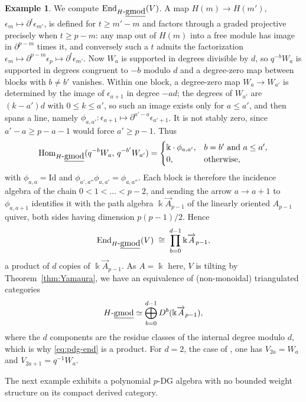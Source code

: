 \documentclass[11pt]{article}
\theoremstyle{definition}
\newtheorem{example}[thm]{Example}
\numberwithin{equation}{section}
\def\udgmod{\mbox{-\underline{gmod}}}
\def\Id{\mathrm{Id}}
\newcommand{\kk}{\Bbbk}
\newcommand{\Hom}{\operatorname{Hom}}
\newcommand{\End}{\operatorname{End}}
\begin{document}
\begin{example}
We compute $\End_{H\udgmod}(V)$.  A map
$H(m)\to H(m')$, $\epsilon_m\mapsto\partial^{t}\epsilon_{m'}$, is defined
for $t\ge m'-m$ and factors through a graded projective precisely when
$t\ge p-m$: any map out of $H(m)$ into a free module has image in
$\partial^{p-m}$ times it, and conversely such a $t$ admits the factorization
$\epsilon_m\mapsto\partial^{p-m}\epsilon_p\mapsto\partial^{t}\epsilon_{m'}$.
Now $W_a$ is supported in degrees divisible by $d$, so $q^{-b}W_a$ is
supported in degrees congruent to $-b$ modulo $d$ and a degree-zero map
between blocks with $b\ne b'$ vanishes.  Within one block, a degree-zero map
$W_a\to W_{a'}$ is determined by the image of $\epsilon_{a+1}$ in degree
$-ad$; the degrees of $W_{a'}$ are $(k-a')d$ with $0\le k\le a'$, so such an
image exists only for $a\le a'$, and then spans a line, namely
$\phi_{a,a'}\colon\epsilon_{a+1}\mapsto\partial^{a'-a}\epsilon_{a'+1}$.  It is
not stably zero, since $a'-a\ge p-a-1$ would force $a'\ge p-1$.  Thus
\[
\Hom_{H\udgmod}(q^{-b}W_a,\,q^{-b'}W_{a'})=
\begin{cases}
\kk\cdot\phi_{a,a'},& b=b'\text{ and }a\le a',\\
0,&\text{otherwise,}
\end{cases}
\]
with $\phi_{a,a}=\Id$ and $\phi_{a',a''}\phi_{a,a'}=\phi_{a,a''}$.  Each block
is therefore the incidence algebra of the chain $0<1<\dots<p-2$, and sending
the arrow $a\to a+1$ to $\phi_{a,a+1}$ identifies it with the path algebra
$\kk\overrightarrow{A}_{p-1}$ of the linearly oriented $A_{p-1}$ quiver, both sides having
dimension $p(p-1)/2$.  Hence
\begin{equation}\label{eq:pdg-end}
\End_{H\udgmod}(V)\;\cong\;\prod_{b=0}^{d-1}\kk\overrightarrow{A}_{p-1} ,
\end{equation}
a product of $d$ copies of $\kk\overrightarrow{A}_{p-1}$.  As $A=\kk$ here, $V$ is tilting by Theorem~\ref{thm:Yamaura}, we have an equivalence of (non-monoidal) triangulated categories
\begin{equation}
    H\udgmod\simeq\bigoplus_{b=0}^{d-1}D^b(\kk\overrightarrow{A}_{p-1}), 
\end{equation}
where the $d$ components
are the residue classes of the internal degree modulo $d$, which is why
\eqref{eq:pdg-end} is a product.  For $d=2$, the case of \cite{KQ}, one has
$V_{2a}=W_a$ and $V_{2a+1}=q^{-1}W_a$.
\end{example}

The next example exhibits a polynomial $p$-DG algebra with no bounded weight structure on its compact derived category.
\end{document}
